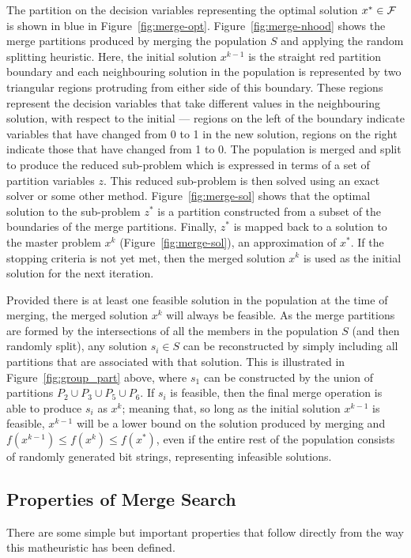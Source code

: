 \documentclass[preprint]{elsarticle}
\begin{document}
The partition on the decision variables representing the optimal solution $x^* \in {\cal F}$ is shown in blue in Figure~\ref{fig:merge-opt}. Figure~\ref{fig:merge-nhood} shows the merge partitions produced by merging the population $S$ and applying the random splitting heuristic. Here, the initial solution $x^{k-1}$ is the straight red partition boundary and each neighbouring solution in the population is represented by two triangular regions protruding from either side of this boundary. These regions represent the decision variables that take different values in the neighbouring solution, with respect to the initial --- regions on the left of the boundary indicate variables that have changed from 0 to 1 in the new solution, regions on the right indicate those that have changed from 1 to 0. The population is merged and split to produce the reduced sub-problem which is expressed in terms of a set of partition variables $z$. This reduced sub-problem is then solved using an exact solver or some other method. Figure~\ref{fig:merge-sol} shows that the optimal solution to the sub-problem $z^*$ is a partition constructed from a subset of the boundaries of the merge partitions. Finally, $z^*$ is mapped back to a solution to the master problem $x^k$ (Figure~\ref{fig:merge-sol}), an approximation of $x^*$. If the stopping criteria is not yet met, then the merged solution $x^k$ is used as the initial solution for the next iteration.

Provided there is at least one feasible solution in the population at the time of merging, the merged solution $x^k$ will always be feasible. As the merge partitions are formed by the intersections of all the members in the population $S$ (and then randomly split), any solution $s_i \in S$ can be reconstructed by simply including all partitions that are associated with that solution. This is illustrated in Figure~\ref{fig:group_part} above, where $s_1$ can be constructed by the union of partitions $P_2 \cup P_3 \cup P_5 \cup P_6$. If $s_i$ is feasible, then the final merge operation is able to produce $s_i$ as $x^k$; meaning that, so long as the initial solution $x^{k-1}$ is feasible, $x^{k-1}$ will be a lower bound on the solution produced by merging and $f(x^{k-1}) \leq f(x^k) \leq f(x^*)$, even if the entire rest of the population consists of randomly generated bit strings, representing infeasible solutions.


\subsection{Properties of Merge Search}
There are some simple but important properties that follow directly from the way this matheuristic has been defined.
\end{document}
